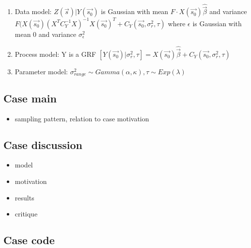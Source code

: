 \documentclass{report}
\begin{document}
\begin{enumerate}
\item Data model: $Z(\vec{s})|Y(\vec{s_0})$ is Gaussian with mean $F \cdot X(\vec{s_0})\hat{\vec{\beta}}$ and variance $F(X(\vec{s_0})(X^{T}C_Y^{-1}X)^{-1}X(\vec{s_0})^T + C_Y(\vec{s_0}, \sigma_{r}^2, \tau) $ where $\epsilon$ is Gaussian with mean 0 and variance $\sigma_{\epsilon}^2$
\item Process model: Y is a GRF $[Y(\vec{s_0}) | \sigma_{r}^2, \tau]  = X(\vec{s_0})\hat{\vec{\beta}} + C_Y(\vec{s_0}, \sigma_{r}^2, \tau)$
\item Parameter model: $\sigma_{range}^2 \sim Gamma(\alpha, \kappa), \tau \sim Exp(\lambda)$ 
\end{enumerate}
\subsection{Case main}
\begin{itemize}
\item sampling pattern,  relation to case motivation
\end{itemize}
\subsection{Case discussion}
\begin{itemize}
\item model
\item motivation
\item results
\item critique
\end{itemize}
\subsection{Case code}
\end{document}
